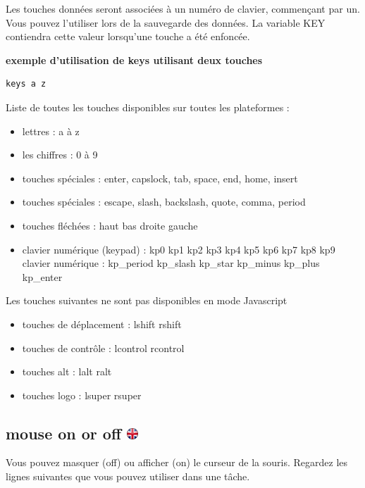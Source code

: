 \documentclass[
]{book}
\providecommand{\tightlist}{%
  \setlength{\itemsep}{0pt}\setlength{\parskip}{0pt}}
\begin{document}
Les touches données seront associées à un numéro de clavier, commençant par un. Vous pouvez l'utiliser lors de la sauvegarde des données. La variable KEY contiendra cette valeur lorsqu'une touche a été enfoncée.

\textbf{exemple d'utilisation de keys utilisant deux touches}

\begin{verbatim}
keys a z
\end{verbatim}

Liste de toutes les touches disponibles sur toutes les plateformes :

\begin{itemize}
\tightlist
\item
  lettres : a à z
\item
  les chiffres : 0 à 9
\item
  touches spéciales : enter, capslock, tab, space, end, home, insert
\item
  touches spéciales : escape, slash, backslash, quote, comma, period
\item
  touches fléchées : haut bas droite gauche
\item
  clavier numérique (keypad) : kp0 kp1 kp2 kp3 kp4 kp5 kp6 kp7 kp8 kp9
  clavier numérique : kp\_period kp\_slash kp\_star kp\_minus kp\_plus kp\_enter
\end{itemize}

Les touches suivantes ne sont pas disponibles en mode Javascript

\begin{itemize}
\tightlist
\item
  touches de déplacement : lshift rshift
\item
  touches de contrôle : lcontrol rcontrol
\item
  touches alt : lalt ralt
\item
  touches logo : lsuper rsuper
\end{itemize}

\hypertarget{mouse-on-or-off}{%
\subsection[mouse on or off ]{\texorpdfstring{mouse on or off \href{https://www.psytoolkit.org/doc3.4.0/syntax.html\#task-mouse}{\protect\includegraphics{img/ukflag.png}}}{mouse on or off }}\label{mouse-on-or-off}}

Vous pouvez masquer (off) ou afficher (on) le curseur de la souris. Regardez les lignes suivantes que vous pouvez utiliser dans une tâche.
\end{document}
